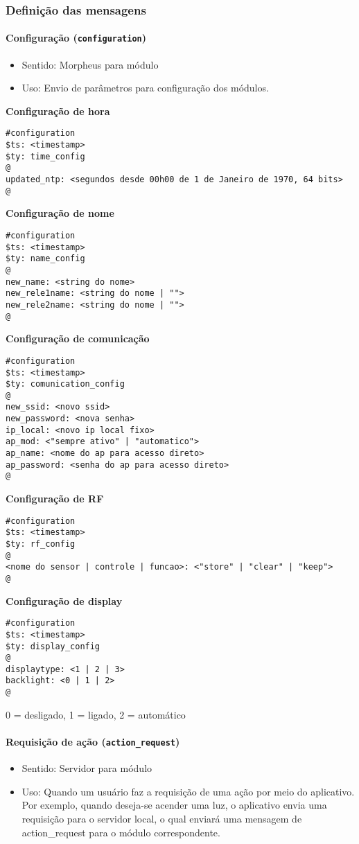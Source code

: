 \subsubsection{Definição das mensagens}

\paragraph{Configuração (\texttt{configuration})}
\begin{itemize}
\item Sentido: Morpheus para módulo
\item Uso: Envio de parâmetros para configuração dos módulos.
\end{itemize}

\textbf{Configuração de hora}
\begin{lstlisting}
#configuration
$ts: <timestamp>
$ty: time_config
@
updated_ntp: <segundos desde 00h00 de 1 de Janeiro de 1970, 64 bits>
@
\end{lstlisting}

\textbf{Configuração de nome}
\begin{lstlisting}
#configuration
$ts: <timestamp>
$ty: name_config
@
new_name: <string do nome>
new_rele1name: <string do nome | "">
new_rele2name: <string do nome | "">
@
\end{lstlisting}

\textbf{Configuração de comunicação}
\begin{lstlisting}
#configuration
$ts: <timestamp>
$ty: comunication_config
@
new_ssid: <novo ssid>
new_password: <nova senha>
ip_local: <novo ip local fixo>
ap_mod: <"sempre ativo" | "automatico">
ap_name: <nome do ap para acesso direto>
ap_password: <senha do ap para acesso direto>
@
\end{lstlisting}

\textbf{Configuração de RF}
\begin{lstlisting}
#configuration
$ts: <timestamp>
$ty: rf_config
@
<nome do sensor | controle | funcao>: <"store" | "clear" | "keep">
@
\end{lstlisting}

\textbf{Configuração de display}
\begin{lstlisting}
#configuration
$ts: <timestamp>
$ty: display_config
@
displaytype: <1 | 2 | 3>
backlight: <0 | 1 | 2>
@
\end{lstlisting}
0 = desligado, 1 = ligado, 2 = automático

\paragraph{Requisição de ação (\texttt{action\_request})}
\begin{itemize}
\item Sentido: Servidor para módulo
\item Uso: Quando um usuário faz a requisição de uma ação por meio do aplicativo. Por exemplo, quando deseja-se acender uma luz, o aplicativo envia uma requisição para o servidor local, o qual enviará uma mensagem de action\_request para o módulo correspondente.
\end{itemize}

